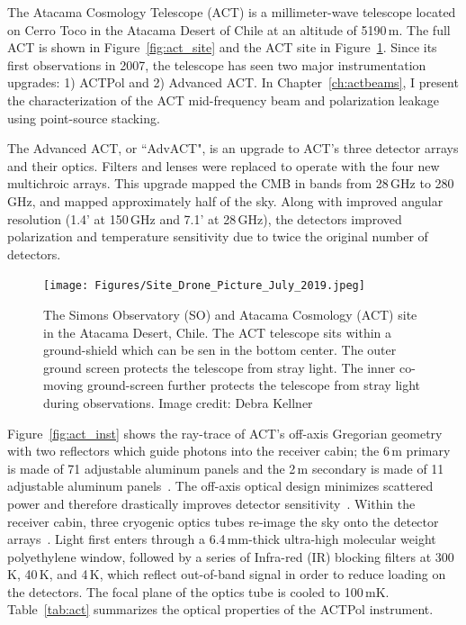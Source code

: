 The Atacama Cosmology Telescope (ACT) is a millimeter-wave telescope located on Cerro Toco in the Atacama Desert of Chile at an altitude of 5190\,m.  The full ACT is shown in Figure~\ref{fig:act_site} and the ACT site in Figure~\ref{fig:act_so_site}.  Since its first observations in 2007, the telescope has seen two major instrumentation upgrades: 1) ACTPol and 2) Advanced ACT.  In Chapter~\ref{ch:actbeams}, I present the characterization of the ACT mid-frequency beam and polarization leakage using point-source stacking.

The Advanced ACT, or ``AdvACT", is an upgrade to ACT's three detector arrays and their optics.  Filters and lenses were replaced to operate with the four new multichroic arrays.  This upgrade mapped the CMB in bands from 28\,GHz to 280\,GHz, and mapped approximately half of the sky.  Along with improved angular resolution (1.4' at 150\,GHz and 7.1' at 28\,GHz), the detectors improved polarization and temperature sensitivity due to twice the original number of detectors.
\begin{figure}[t]
    \centering
    \texttt{[image: Figures/Site\_Drone\_Picture\_July\_2019.jpeg]}
    \caption{The Simons Observatory (SO) and Atacama Cosmology (ACT) site in the Atacama Desert, Chile. The ACT telescope sits within a ground-shield which can be sen in the bottom center.  The outer ground screen protects the telescope from stray light.  The inner co-moving ground-screen further protects the telescope from stray light during observations.  Image credit: Debra Kellner}
    \label{fig:act_so_site}
\end{figure}

Figure~\ref{fig:act_inst} shows the ray-trace of ACT's off-axis Gregorian geometry with two reflectors which guide photons into the receiver cabin; the 6\,m primary is made of 71 adjustable aluminum panels and the 2\,m secondary is made of 11 adjustable aluminum panels~\cite{act_inst}.  The off-axis optical design minimizes scattered power and therefore drastically improves detector sensitivity~\cite{fowler_2007}.  Within the receiver cabin, three cryogenic optics tubes re-image the sky onto the detector arrays~\cite{thornton_2016}.  Light first enters through a 6.4\,mm-thick ultra-high molecular weight polyethylene window, followed by a series of Infra-red (IR) blocking filters at 300\,K, 40\,K, and 4\,K, which reflect out-of-band signal in order to reduce loading on the detectors.  The focal plane of the optics tube is cooled to 100\,mK.   Table~\ref{tab:act} summarizes the optical properties of the ACTPol instrument.


